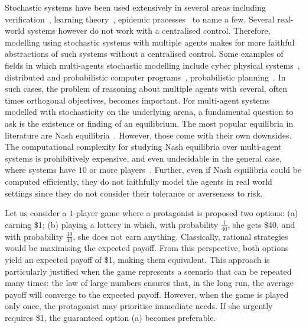 Stochastic systems have been used extensively in several areas including  verification~\cite{FKNP11}, learning theory~\cite{AJKS21}, epidemic processes~\cite{Lef81} to name a few. Several real-world systems however do not work with a centralised control. Therefore, modelling using stochastic systems with multiple agents makes for more faithful abstractions of such systems without a centralised control. Some examples of fields in which multi-agents stochastic modelling include cyber physical systems~\cite{SEC16}, distributed and probabilistic computer programs~\cite{dAHJ01}, probabilistic planning~\cite{TKI10}. In such cases, the problem of reasoning about multiple agents with several, often times orthogonal objectives, becomes important. %
For multi-agent systems modelled with stochasticity on the underlying arena, a fundamental question to ask is the existence or finding of an equilibrium.
The most popular equilibria in literature are Nash equilibria~\cite{Nas50}. However, those come with their own downsides. The computational complexity for studying Nash equilibria over multi-agent systems is prohibitively expensive, and even undecidable in the general case, where systems have $10$ or more players~\cite{UW11}. 
Further, even if Nash equilibria could be computed efficiently, they do not faithfully model the agents in real world settings
since they do not consider their tolerance or averseness to risk.

Let us consider a $1$-player game where a protagonist is proposed two options: (a) earning \$1; (b) playing a lottery in which, with probability $\frac{1}{40}$, she gets \$40, and with probability $\frac{39}{40}$, she does not earn anything.
Classically, rational strategies would be maximising the expected payoff. From this perspective, both options yield an expected payoff of \$1, making them equivalent.
This approach is particularly justified when the game represents a scenario that can be repeated many times: the law of large numbers ensures that, in the long run, the average payoff will converge to the expected payoff. However, when the game is played only once, the protagonist may prioritise immediate needs. If she urgently requires \$1, the guaranteed option (a) becomes preferable.

